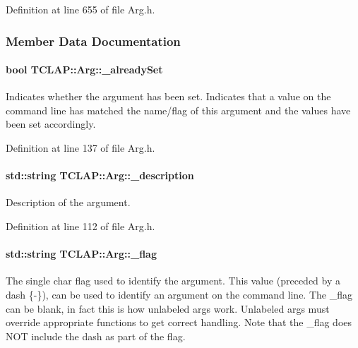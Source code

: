 Definition at line 655 of file Arg.\+h.



\subsubsection{Member Data Documentation}
\paragraph[{\texorpdfstring{\+\_\+already\+Set}{_alreadySet}}]{\setlength{\rightskip}{0pt plus 5cm}bool T\+C\+L\+A\+P\+::\+Arg\+::\+\_\+already\+Set\hspace{0.3cm}{\ttfamily [protected]}}\hypertarget{classTCLAP_1_1Arg_a829e32129857d2683e5791a5df1208ec}{}\label{classTCLAP_1_1Arg_a829e32129857d2683e5791a5df1208ec}
Indicates whether the argument has been set. Indicates that a value on the command line has matched the name/flag of this argument and the values have been set accordingly. 

Definition at line 137 of file Arg.\+h.

\paragraph[{\texorpdfstring{\+\_\+description}{_description}}]{\setlength{\rightskip}{0pt plus 5cm}std\+::string T\+C\+L\+A\+P\+::\+Arg\+::\+\_\+description\hspace{0.3cm}{\ttfamily [protected]}}\hypertarget{classTCLAP_1_1Arg_a9882fe256eaab01ac53db54ac657d272}{}\label{classTCLAP_1_1Arg_a9882fe256eaab01ac53db54ac657d272}
Description of the argument. 

Definition at line 112 of file Arg.\+h.

\paragraph[{\texorpdfstring{\+\_\+flag}{_flag}}]{\setlength{\rightskip}{0pt plus 5cm}std\+::string T\+C\+L\+A\+P\+::\+Arg\+::\+\_\+flag\hspace{0.3cm}{\ttfamily [protected]}}\hypertarget{classTCLAP_1_1Arg_ae68407a0a8223023ad0ae3b9dc7986f5}{}\label{classTCLAP_1_1Arg_ae68407a0a8223023ad0ae3b9dc7986f5}
The single char flag used to identify the argument. This value (preceded by a dash \{-\/\}), can be used to identify an argument on the command line. The \+\_\+flag can be blank, in fact this is how unlabeled args work. Unlabeled args must override appropriate functions to get correct handling. Note that the \+\_\+flag does N\+OT include the dash as part of the flag. 


